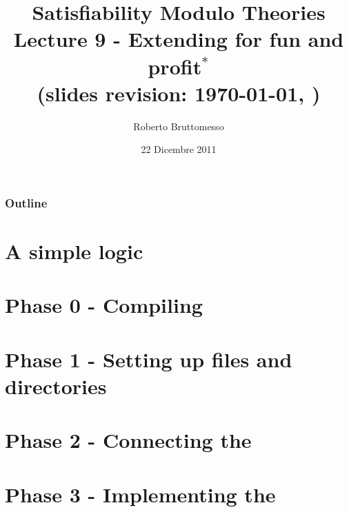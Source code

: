 \documentclass[xcolor=dvipsnames
              ]{beamer}
\title[\opensmt]{Satisfiability Modulo Theories\\ Lecture 9 - Extending \opensmt for fun and profit$^*$\\ {\tiny (slides revision: \today, \currenttime)}}
\author[R. Bruttomesso]{\large Roberto Bruttomesso}
\date{22 Dicembre 2011}
\institute[SMT]{\large Seminario di Logica Matematica \\ (Corso Prof. Silvio Ghilardi)}
\begin{document}
\frame{\titlepage}

\begin{frame}
  \frametitle{Outline}
  \tableofcontents
\end{frame}

\section{A simple logic}


\section{Phase 0 - Compiling \opensmt}


\section{Phase 1 - Setting up files and directories}


\section{Phase 2 - Connecting the \tsolver}


\section{Phase 3 - Implementing the \tsolver}



\end{document}
